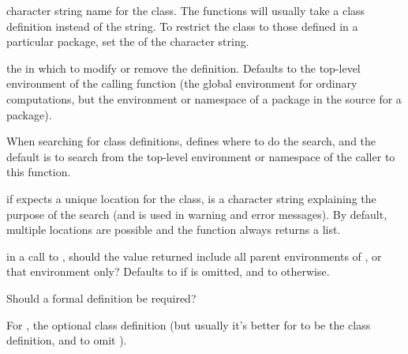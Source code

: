 \begin{Arguments}
\begin{ldescription}
\item[\code{Class}] character string name for the class.  The functions will
usually take a class definition instead of the string.  To restrict
the class to those defined in a particular package, set the
 of the character string.
\item[\code{where}] the  in which to modify or
remove the definition.  Defaults to the top-level environment of the
calling function (the global environment for ordinary computations,
but the environment or namespace of a package in the source for a
package).

When searching for class definitions,  defines where to
do the search, and the default is to search from the top-level
environment or namespace of the caller to this function.

\item[\code{unique}] if  expects a unique location for the
class,  is a character string explaining the purpose
of the search (and is used in warning and error messages).  By
default, multiple locations are possible and the function always
returns a list.

\item[\code{inherits}] in a call to , should the value
returned include all parent environments of , or that
environment only?  Defaults to  if  is
omitted, and to  otherwise.

\item[\code{formal}]  Should a formal definition be required? 
\item[\code{classDef}]  For , the optional class
definition (but usually it's better for  to be the
class definition, and to omit ).

\end{ldescription}
\end{Arguments}
%
